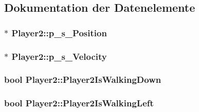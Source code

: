 \subsection{Dokumentation der Datenelemente}
\hypertarget{class_player2_a4860deaf1ac80d595c1a43a6453514b2}{
\subsubsection[{p\-\_\-s\-\_\-\-Position}]{$\ast$ Player2\-::p\-\_\-s\-\_\-\-Position\hspace{0.3cm}{\ttfamily [private]}}}\label{class_player2_a4860deaf1ac80d595c1a43a6453514b2}
\hypertarget{class_player2_a4ec7a7c22808ad8f266ec881151bbe8e}{
\subsubsection[{p\-\_\-s\-\_\-\-Velocity}]{$\ast$ Player2\-::p\-\_\-s\-\_\-\-Velocity\hspace{0.3cm}{\ttfamily [private]}}}\label{class_player2_a4ec7a7c22808ad8f266ec881151bbe8e}
\hypertarget{class_player2_acaa30e9bf46123ac88a0e2dcde20db03}{
\subsubsection[{Player2\-Is\-Walking\-Down}]{\setlength{\rightskip}{0pt plus 5cm}bool Player2\-::\-Player2\-Is\-Walking\-Down\hspace{0.3cm}{\ttfamily [private]}}}\label{class_player2_acaa30e9bf46123ac88a0e2dcde20db03}
\hypertarget{class_player2_aee050a236d79f3f1323ee728716d3a5f}{
\subsubsection[{Player2\-Is\-Walking\-Left}]{\setlength{\rightskip}{0pt plus 5cm}bool Player2\-::\-Player2\-Is\-Walking\-Left\hspace{0.3cm}{\ttfamily [private]}}}\label{class_player2_aee050a236d79f3f1323ee728716d3a5f}
